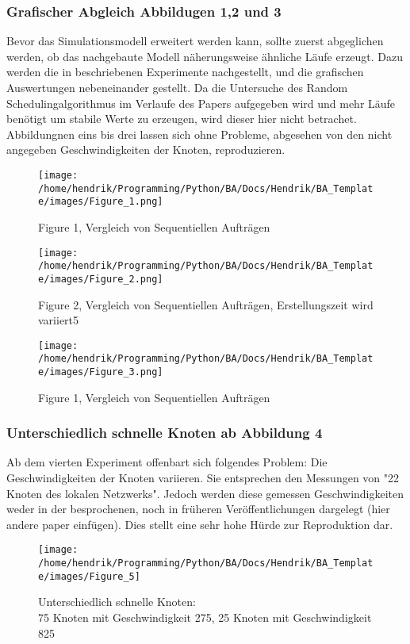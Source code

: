 \subsubsection{Grafischer Abgleich Abbildugen 1,2 und 3}
Bevor das Simulationsmodell erweitert werden kann, sollte zuerst abgeglichen werden, ob das nachgebaute Modell näherungsweise ähnliche Läufe erzeugt. Dazu werden die in \cite{Arn99} beschriebenen Experimente nachgestellt, und die grafischen Auswertungen nebeneinander gestellt.
Da die Untersuche des Random Schedulingalgorithmus im Verlaufe des Papers aufgegeben wird und mehr Läufe benötigt um stabile Werte zu erzeugen, wird dieser hier nicht betrachet.\\
Abbildungnen eins bis drei lassen sich ohne Probleme, abgesehen von den nicht angegeben Geschwindigkeiten der Knoten, reproduzieren.
\begin{figure}
\centering
\texttt{[image: /home/hendrik/Programming/Python/BA/Docs/Hendrik/BA\_Template/images/Figure\_1.png]}
\caption{Figure 1, Vergleich von Sequentiellen Aufträgen}
\label{figure1}
\end{figure}
\begin{figure}
	\centering
	\texttt{[image: /home/hendrik/Programming/Python/BA/Docs/Hendrik/BA\_Template/images/Figure\_2.png]}
	\caption{Figure 2, Vergleich von Sequentiellen Aufträgen, Erstellungszeit wird variiert5}
	\label{figure1}
\end{figure}
\begin{figure}
	\centering
	\texttt{[image: /home/hendrik/Programming/Python/BA/Docs/Hendrik/BA\_Template/images/Figure\_3.png]}
	\caption{Figure 1, Vergleich von Sequentiellen Aufträgen}
	\label{figure3}
\end{figure}

\FloatBarrier

\subsubsection{Unterschiedlich schnelle Knoten ab Abbildung 4}
Ab dem vierten Experiment offenbart sich folgendes Problem: Die Geschwindigkeiten der Knoten variieren. Sie entsprechen den Messungen von "22 Knoten des lokalen Netzwerks". Jedoch werden diese gemessen Geschwindigkeiten weder in der besprochenen, noch in früheren Veröffentlichungen dargelegt (hier andere paper einfügen). Dies stellt eine sehr hohe Hürde zur Reproduktion dar.\\

\begin{figure}
	\centering
	\texttt{[image: /home/hendrik/Programming/Python/BA/Docs/Hendrik/BA\_Template/images/Figure\_5]}
	\caption{Unterschiedlich schnelle Knoten:\\
	75 Knoten mit Geschwindigkeit 275, 25 Knoten mit Geschwindigkeit 825}
	\label{figure5}
\end{figure}


